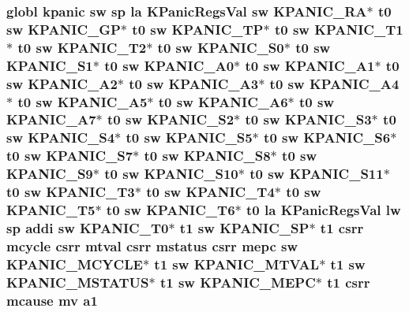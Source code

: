 \hypertarget{riscv_2kpanica_8S_af8c2c0f8c70c44bea7f3bd8c83d7da06}{
\subsubsection[{a1}]{\setlength{\rightskip}{0pt plus 5cm}globl {\bf kpanic} {\bf sw} {\bf sp} {\bf la} {\bf K\-Panic\-Regs\-Val} {\bf sw} {\bf K\-P\-A\-N\-I\-C\-\_\-\-R\-A}$\ast$ {\bf t0} {\bf sw} {\bf K\-P\-A\-N\-I\-C\-\_\-\-G\-P}$\ast$ {\bf t0} {\bf sw} {\bf K\-P\-A\-N\-I\-C\-\_\-\-T\-P}$\ast$ {\bf t0} {\bf sw} {\bf K\-P\-A\-N\-I\-C\-\_\-\-T1}$\ast$ {\bf t0} {\bf sw} {\bf K\-P\-A\-N\-I\-C\-\_\-\-T2}$\ast$ {\bf t0} {\bf sw} {\bf K\-P\-A\-N\-I\-C\-\_\-\-S0}$\ast$ {\bf t0} {\bf sw} {\bf K\-P\-A\-N\-I\-C\-\_\-\-S1}$\ast$ {\bf t0} {\bf sw} {\bf K\-P\-A\-N\-I\-C\-\_\-\-A0}$\ast$ {\bf t0} {\bf sw} {\bf K\-P\-A\-N\-I\-C\-\_\-\-A1}$\ast$ {\bf t0} {\bf sw} {\bf K\-P\-A\-N\-I\-C\-\_\-\-A2}$\ast$ {\bf t0} {\bf sw} {\bf K\-P\-A\-N\-I\-C\-\_\-\-A3}$\ast$ {\bf t0} {\bf sw} {\bf K\-P\-A\-N\-I\-C\-\_\-\-A4}$\ast$ {\bf t0} {\bf sw} {\bf K\-P\-A\-N\-I\-C\-\_\-\-A5}$\ast$ {\bf t0} {\bf sw} {\bf K\-P\-A\-N\-I\-C\-\_\-\-A6}$\ast$ {\bf t0} {\bf sw} {\bf K\-P\-A\-N\-I\-C\-\_\-\-A7}$\ast$ {\bf t0} {\bf sw} {\bf K\-P\-A\-N\-I\-C\-\_\-\-S2}$\ast$ {\bf t0} {\bf sw} {\bf K\-P\-A\-N\-I\-C\-\_\-\-S3}$\ast$ {\bf t0} {\bf sw} {\bf K\-P\-A\-N\-I\-C\-\_\-\-S4}$\ast$ {\bf t0} {\bf sw} {\bf K\-P\-A\-N\-I\-C\-\_\-\-S5}$\ast$ {\bf t0} {\bf sw} {\bf K\-P\-A\-N\-I\-C\-\_\-\-S6}$\ast$ {\bf t0} {\bf sw} {\bf K\-P\-A\-N\-I\-C\-\_\-\-S7}$\ast$ {\bf t0} {\bf sw} {\bf K\-P\-A\-N\-I\-C\-\_\-\-S8}$\ast$ {\bf t0} {\bf sw} {\bf K\-P\-A\-N\-I\-C\-\_\-\-S9}$\ast$ {\bf t0} {\bf sw} {\bf K\-P\-A\-N\-I\-C\-\_\-\-S10}$\ast$ {\bf t0} {\bf sw} {\bf K\-P\-A\-N\-I\-C\-\_\-\-S11}$\ast$ {\bf t0} {\bf sw} {\bf K\-P\-A\-N\-I\-C\-\_\-\-T3}$\ast$ {\bf t0} {\bf sw} {\bf K\-P\-A\-N\-I\-C\-\_\-\-T4}$\ast$ {\bf t0} {\bf sw} {\bf K\-P\-A\-N\-I\-C\-\_\-\-T5}$\ast$ {\bf t0} {\bf sw} {\bf K\-P\-A\-N\-I\-C\-\_\-\-T6}$\ast$ {\bf t0} {\bf la} {\bf K\-Panic\-Regs\-Val} {\bf lw} {\bf sp} addi {\bf sw} {\bf K\-P\-A\-N\-I\-C\-\_\-\-T0}$\ast$ {\bf t1} {\bf sw} {\bf K\-P\-A\-N\-I\-C\-\_\-\-S\-P}$\ast$ {\bf t1} csrr mcycle csrr mtval csrr {\bf mstatus} csrr {\bf mepc} {\bf sw} {\bf K\-P\-A\-N\-I\-C\-\_\-\-M\-C\-Y\-C\-L\-E}$\ast$ {\bf t1} {\bf sw} {\bf K\-P\-A\-N\-I\-C\-\_\-\-M\-T\-V\-A\-L}$\ast$ {\bf t1} {\bf sw} {\bf K\-P\-A\-N\-I\-C\-\_\-\-M\-S\-T\-A\-T\-U\-S}$\ast$ {\bf t1} {\bf sw} {\bf K\-P\-A\-N\-I\-C\-\_\-\-M\-E\-P\-C}$\ast$ {\bf t1} csrr mcause mv a1}}\label{riscv_2kpanica_8S_af8c2c0f8c70c44bea7f3bd8c83d7da06}
